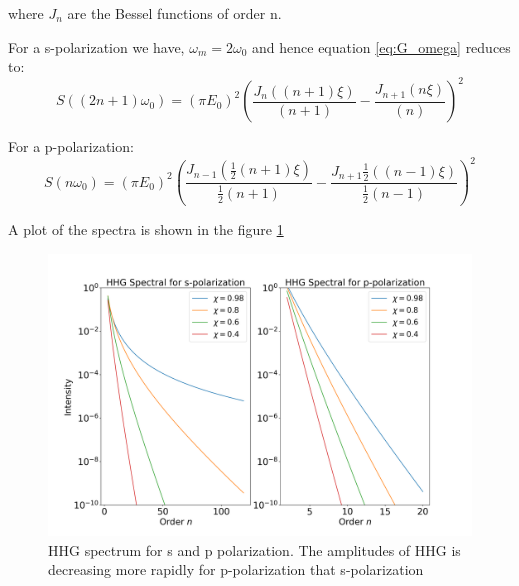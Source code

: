 \documentclass[12pt]{article}
\begin{document}
where $J_n$ are the Bessel functions of order n.

For a s-polarization we have, $\omega_m = 2 \omega_0$ and hence equation \ref{eq:G_omega} reduces to:
\begin{equation}
    \label{eq:s-spectrum}
    S((2n+1)\omega_0) = (\pi E_0)^2\left(\frac{J_n((n+1)\xi)}{(n+1)}- \frac{J_{n+1}(n\xi)}{(n)}\right)^2
\end{equation}

For a p-polarization:
\begin{equation}
    \label{eq:p-spectrum}
    S(n\omega_0) = (\pi E_0)^2\left(\frac{J_{n-1}(\frac{1}{2}(n+1)\xi)}{\frac{1}{2}(n+1)}- \frac{J_{n+1}\frac{1}{2}((n-1)\xi)}{\frac{1}{2}(n-1)}\right)^2
\end{equation}

A plot of the spectra is shown in the figure \ref{fig:spectrum}
\begin{figure}[h]
    \centering
    \includegraphics[width=1\textwidth]{images/spectrum.png}
    \caption{HHG spectrum for s and p polarization. The amplitudes of HHG is decreasing more rapidly for p-polarization that s-polarization}
    \label{fig:spectrum}
\end{figure}
\end{document}
